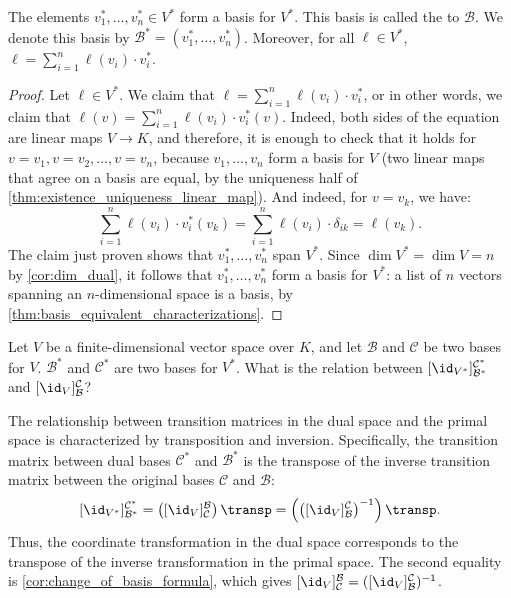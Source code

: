 \begin{lemma}
  \label{lem:dual_basis}
  The elements $v_1^*, \dots, v_n^* \in V^*$ form a basis for $V^*$. This basis is called the  to $\mathcal{B}$. We denote this basis by $\mathcal{B}^* = (v_1^*, \dots, v_n^*)$. Moreover, for all $\ell \in V^*$, $\ell = \sum_{i=1}^n \ell(v_i) \cdot v_i^*$.
\end{lemma}

\begin{proof}
  Let $\ell \in V^*$. We claim that $\ell = \sum_{i=1}^n \ell(v_i) \cdot v_i^*$, or in other words, we claim that $\ell(v) = \sum_{i=1}^n \ell(v_i) \cdot v_i^*(v)$. Indeed, both sides of the equation are linear maps $V \to K$, and therefore, it is enough to check that it holds for $v = v_1, v = v_2, \dots, v = v_n$, because $v_1, \dots, v_n$ form a basis for $V$ (two linear maps that agree on a basis are equal, by the uniqueness half of \cref{thm:existence_uniqueness_linear_map}). And indeed, for $v = v_k$, we have:
  \[ \sum_{i=1}^n \ell(v_i) \cdot v_i^*(v_k) = \sum_{i=1}^n \ell(v_i) \cdot \delta_{ik} = \ell(v_k). \]
  The claim just proven shows that $v_1^*, \dots, v_n^*$ span $V^*$. Since $\dim V^* = \dim V = n$ by \cref{cor:dim_dual}, it follows that $v_1^*, \dots, v_n^*$ form a basis for $V^*$: a list of $n$ vectors spanning an $n$-dimensional space is a basis, by \cref{thm:basis_equivalent_characterizations}.
\end{proof}

\begin{question}Let $V$ be a finite-di\-men\-sional vector space over $K$, and let $\mathcal{B}$ and $\mathcal{C}$ be two bases for $V$. $\mathcal{B}^*$ and $\mathcal{C}^*$ are two bases for $V^*$. What is the relation between $[\id_{V^*}]_{\mathcal{B}^*}^{\mathcal{C}^*}$ and $[\id_V]_{\mathcal{B}}^{\mathcal{C}}$?
\end{question}

\begin{proposition}
  \label{prop:dual_change_of_basis}
  The relationship between transition matrices in the dual space and the primal space is characterized by transposition and inversion. Specifically, the transition matrix between dual bases $\mathcal{C}^*$ and $\mathcal{B}^*$ is the transpose of the inverse transition matrix between the original bases $\mathcal{C}$ and $\mathcal{B}$:
  \[
  [\id_{V^*}]_{\mathcal{B}^*}^{\mathcal{C}^*} = \left( [\id_V]_{\mathcal{C}}^{\mathcal{B}} \right)\transp = \left( \left( [\id_V]_{\mathcal{B}}^{\mathcal{C}} \right)^{-1} \right)\transp.
  \]
  Thus, the coordinate transformation in the dual space corresponds to the transpose of the inverse transformation in the primal space. The second equality is \cref{cor:change_of_basis_formula}, which gives $[\id_V]_{\mathcal{C}}^{\mathcal{B}} = ([\id_V]_{\mathcal{B}}^{\mathcal{C}})^{-1}$.
\end{proposition}

